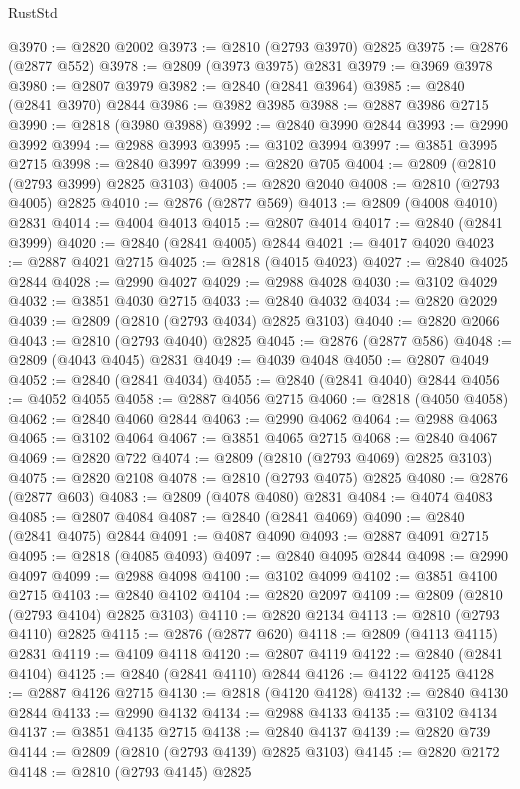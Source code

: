 \begin{lexlean}{RustStd}
\begin{coremodule}
@3970 := @2820 @2002
@3973 := @2810 (@2793 @3970) @2825
@3975 := @2876 (@2877 @552)
@3978 := @2809 (@3973 @3975) @2831
@3979 := @3969 @3978
@3980 := @2807 @3979
@3982 := @2840 (@2841 @3964)
@3985 := @2840 (@2841 @3970) @2844
@3986 := @3982 @3985
@3988 := @2887 @3986 @2715
@3990 := @2818 (@3980 @3988)
@3992 := @2840 @3990 @2844
@3993 := @2990 @3992
@3994 := @2988 @3993
@3995 := @3102 @3994
@3997 := @3851 @3995 @2715
@3998 := @2840 @3997
@3999 := @2820 @705
@4004 := @2809 (@2810 (@2793 @3999) @2825 @3103)
@4005 := @2820 @2040
@4008 := @2810 (@2793 @4005) @2825
@4010 := @2876 (@2877 @569)
@4013 := @2809 (@4008 @4010) @2831
@4014 := @4004 @4013
@4015 := @2807 @4014
@4017 := @2840 (@2841 @3999)
@4020 := @2840 (@2841 @4005) @2844
@4021 := @4017 @4020
@4023 := @2887 @4021 @2715
@4025 := @2818 (@4015 @4023)
@4027 := @2840 @4025 @2844
@4028 := @2990 @4027
@4029 := @2988 @4028
@4030 := @3102 @4029
@4032 := @3851 @4030 @2715
@4033 := @2840 @4032
@4034 := @2820 @2029
@4039 := @2809 (@2810 (@2793 @4034) @2825 @3103)
@4040 := @2820 @2066
@4043 := @2810 (@2793 @4040) @2825
@4045 := @2876 (@2877 @586)
@4048 := @2809 (@4043 @4045) @2831
@4049 := @4039 @4048
@4050 := @2807 @4049
@4052 := @2840 (@2841 @4034)
@4055 := @2840 (@2841 @4040) @2844
@4056 := @4052 @4055
@4058 := @2887 @4056 @2715
@4060 := @2818 (@4050 @4058)
@4062 := @2840 @4060 @2844
@4063 := @2990 @4062
@4064 := @2988 @4063
@4065 := @3102 @4064
@4067 := @3851 @4065 @2715
@4068 := @2840 @4067
@4069 := @2820 @722
@4074 := @2809 (@2810 (@2793 @4069) @2825 @3103)
@4075 := @2820 @2108
@4078 := @2810 (@2793 @4075) @2825
@4080 := @2876 (@2877 @603)
@4083 := @2809 (@4078 @4080) @2831
@4084 := @4074 @4083
@4085 := @2807 @4084
@4087 := @2840 (@2841 @4069)
@4090 := @2840 (@2841 @4075) @2844
@4091 := @4087 @4090
@4093 := @2887 @4091 @2715
@4095 := @2818 (@4085 @4093)
@4097 := @2840 @4095 @2844
@4098 := @2990 @4097
@4099 := @2988 @4098
@4100 := @3102 @4099
@4102 := @3851 @4100 @2715
@4103 := @2840 @4102
@4104 := @2820 @2097
@4109 := @2809 (@2810 (@2793 @4104) @2825 @3103)
@4110 := @2820 @2134
@4113 := @2810 (@2793 @4110) @2825
@4115 := @2876 (@2877 @620)
@4118 := @2809 (@4113 @4115) @2831
@4119 := @4109 @4118
@4120 := @2807 @4119
@4122 := @2840 (@2841 @4104)
@4125 := @2840 (@2841 @4110) @2844
@4126 := @4122 @4125
@4128 := @2887 @4126 @2715
@4130 := @2818 (@4120 @4128)
@4132 := @2840 @4130 @2844
@4133 := @2990 @4132
@4134 := @2988 @4133
@4135 := @3102 @4134
@4137 := @3851 @4135 @2715
@4138 := @2840 @4137
@4139 := @2820 @739
@4144 := @2809 (@2810 (@2793 @4139) @2825 @3103)
@4145 := @2820 @2172
@4148 := @2810 (@2793 @4145) @2825

\end{coremodule}
\end{lexlean}
